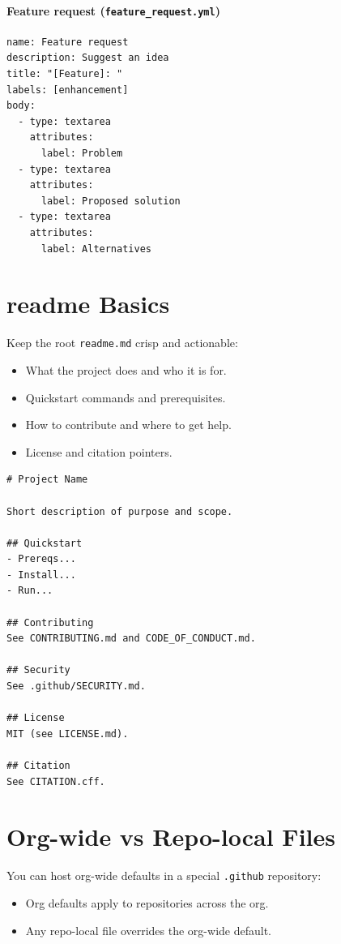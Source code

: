 \documentclass[11pt]{article}
\newcommand{\file}[1]{\texttt{#1}}
\begin{document}
\paragraph{Feature request (\file{feature\_request.yml})}
\begin{verbatim}
name: Feature request
description: Suggest an idea
title: "[Feature]: "
labels: [enhancement]
body:
  - type: textarea
    attributes:
      label: Problem
  - type: textarea
    attributes:
      label: Proposed solution
  - type: textarea
    attributes:
      label: Alternatives
\end{verbatim}
\clearpage

\section{readme Basics}
Keep the root \file{readme.md} crisp and actionable:
\begin{itemize}
  \item What the project does and who it is for.
  \item Quickstart commands and prerequisites.
  \item How to contribute and where to get help.
  \item License and citation pointers.
\end{itemize}

\begin{verbatim}
# Project Name

Short description of purpose and scope.

## Quickstart
- Prereqs...
- Install...
- Run...

## Contributing
See CONTRIBUTING.md and CODE_OF_CONDUCT.md.

## Security
See .github/SECURITY.md.

## License
MIT (see LICENSE.md).

## Citation
See CITATION.cff.
\end{verbatim}

\section{Org-wide vs Repo-local Files}
You can host org-wide defaults in a special \file{.github} repository:
\begin{itemize}
  \item Org defaults apply to repositories across the org.
  \item Any repo-local file overrides the org-wide default.
\end{itemize}
\end{document}
